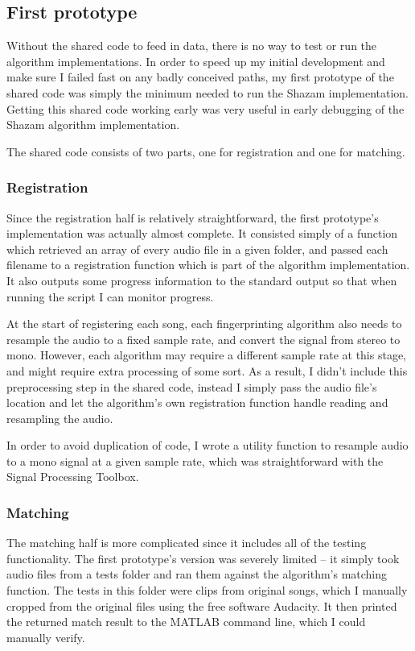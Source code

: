 \documentclass[12pt,a4paper,twoside,openright]{report}
\begin{document}
\subsection{First prototype}

Without the shared code to feed in data, there is no way to test or run the algorithm implementations. In order to speed up my initial development and make sure I failed fast on any badly conceived paths, my first prototype of the shared code was simply the minimum needed to run the Shazam implementation. Getting this shared code working early was very useful in early debugging of the Shazam algorithm implementation.

The shared code consists of two parts, one for registration and one for matching. 

\subsubsection{Registration}

Since the registration half is relatively straightforward, the first prototype's implementation was actually almost complete. It consisted simply of a function which retrieved an array of every audio file in a given folder, and passed each filename to a registration function which is part of the algorithm implementation. It also outputs some progress information to the standard output so that when running the script I can monitor progress.

At the start of registering each song, each fingerprinting algorithm also needs to resample the audio to a fixed sample rate, and convert the signal from stereo to mono. However, each algorithm may require a different sample rate at this stage, and might require extra processing of some sort. As a result, I didn't include this preprocessing step in the shared code, instead I simply pass the audio file's location and let the algorithm's own registration function handle reading and resampling the audio.

In order to avoid duplication of code, I wrote a utility function to resample audio to a mono signal at a given sample rate, which was straightforward with the Signal Processing Toolbox.

\subsubsection{Matching}

The matching half is more complicated since it includes all of the testing functionality. The first prototype's version was severely limited -- it simply took audio files from a tests folder and ran them against the algorithm's matching function. The tests in this folder were clips from original songs, which I manually cropped from the original files using the free software Audacity. It then printed the returned match result to the MATLAB command line, which I could manually verify.
\end{document}
